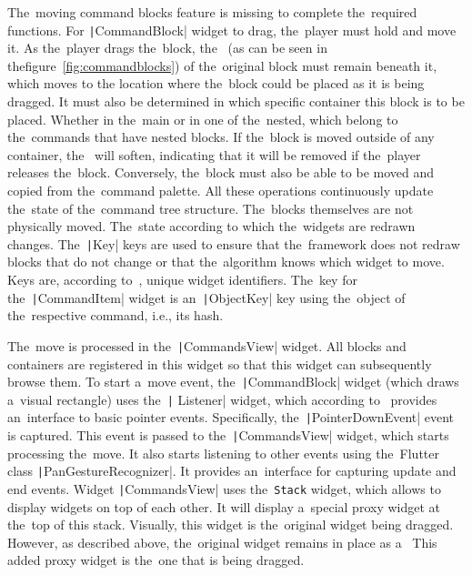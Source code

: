 The~moving command blocks feature is missing to complete the~required functions.
For \texttt|CommandBlock| widget to drag, the~player must hold and move it.
As the~player drags the~block, the~ (as can be seen in the\linebreak{}figure~\ref{fig:commandblocks}) of the~original block must remain beneath it, which moves to the location where the~block could be placed as it is being dragged.
It must also be determined in which specific container this block is to be placed.
Whether in the~main or in one of the~nested, which belong to the~commands that have nested blocks.
If the~block is moved outside of any container, the~ will soften, indicating that it will be removed if the~player releases the~block.
Conversely, the~block must also be able to be moved and copied from the~command palette.
All these operations continuously update the~state of the~command tree structure.
The~blocks themselves are not physically moved.
The~state according to which the~widgets are redrawn changes.
The~\texttt|Key| keys are used to ensure that the~framework does not redraw blocks that do not change or that the~algorithm knows which widget to move.
Keys are, according to~\cite{a2022_material}, unique widget identifiers.
The~key for the~\texttt|CommandItem| widget is an~\texttt|ObjectKey| key using the~object of the~respective command, i.e., its hash.

The~move is processed in the~\texttt|CommandsView| widget.
All blocks and containers are registered in this widget so that this widget can subsequently browse them.
To start a~move event, the~\texttt|CommandBlock| widget (which draws a~visual rectangle) uses the~\texttt| Listener| widget, which according to~\cite{a2022_material} provides an~interface to basic pointer events.
Specifically, the~\texttt|PointerDownEvent| event is captured.
This event is passed to the~\texttt|CommandsView| widget, which starts processing the~move.
It also starts listening to other events using the~Flutter class \texttt|PanGestureRecognizer|.
It provides an~interface for capturing update and end events.
Widget \texttt|CommandsView| uses the~\mintinline {text}|Stack| widget, which allows to display widgets on top of each other.
It will display a~special proxy widget at the~top of this stack.
Visually, this widget is the~original widget being dragged.
However, as described above, the~original widget remains in place as a~
This added proxy widget is the~one that is being dragged.

